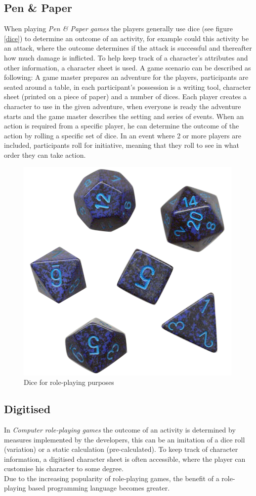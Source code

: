 \subsection*{Pen \& Paper}
When playing \emph{Pen \& Paper games} the players generally use dice (see figure \vref{dice}) to determine an outcome of an activity, for example could this activity be an attack, where the outcome determines if the attack is successful and thereafter how much damage is inflicted. To help keep track of a character's attributes and other information, a character sheet is used.
A game scenario can be described as following: A game master prepares an adventure for the players, participants are seated around a table, in each participant's possession is a writing tool, character sheet (printed on a piece of paper) and a number of dices. Each player creates a character to use in the given adventure, when everyone is ready the adventure starts and the game master describes the setting and series of events. When an action is required from a specific player, he can determine the outcome of the action by rolling a specific set of dice. In an event where 2 or more players are included, participants roll for initiative, meaning that they roll to see in what order they can take action.
\begin{figure}[!h]
\centering
\includegraphics[scale=0.4]{img/rpgdice.png}
\caption{Dice for role-playing purposes}
\label{dice}
\end{figure}
\subsection*{Digitised}
In \emph{Computer role-playing games} the outcome of an activity is determined by measures implemented by the developers, this can be an imitation of a dice roll (variation) or a static calculation (pre-calculated).
To keep track of character information, a digitised character sheet is often accessible, where the player can customise his character to some degree.\\
Due to the increasing popularity of role-playing games, the benefit of a role-playing based programming language becomes greater.
\pagebreak

